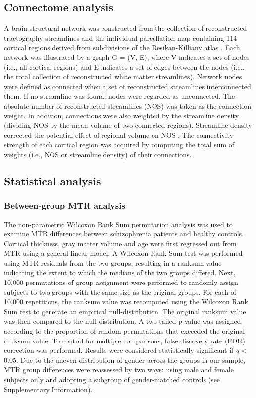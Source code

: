 \begin{refsection}
\subsection*{Connectome analysis}
A brain structural network was constructed from the collection of reconstructed tractography streamlines and the individual parcellation map containing 114 cortical regions derived from subdivisions of the Desikan-Killiany atlas \citep{CAMMOUN2012386,DESIKAN2006968,Fischl2004parcellation}. Each network was illustrated by a graph G = (V, E), where V indicates a set of nodes (i.e., all cortical regions) and E indicates a set of edges between the nodes (i.e., the total collection of reconstructed white matter streamlines). Network nodes were defined as connected when a set of reconstructed streamlines interconnected them. If no streamline was found, nodes were regarded as unconnected. The absolute number of reconstructed streamlines (NOS) was taken as the connection weight. In addition, connections were also weighted by the streamline density (dividing NOS by the mean volume of two connected regions). Streamline density corrected the potential effect of regional volume on NOS \citep{Hagmann2008MappingTS,vanDenHeuvel2011RichclubOO}. The connectivity strength of each cortical region was acquired by computing the total sum of weights (i.e., NOS or streamline density) of their connections.

\subsection*{Statistical analysis}
\subsubsection*{Between-group MTR analysis}
The non-parametric Wilcoxon Rank Sum permutation analysis was used to examine MTR differences between schizophrenia patients and healthy controls. Cortical thickness, gray matter volume and age were first regressed out from MTR using a general linear model. A Wilcoxon Rank Sum test was performed using MTR residuals from the two groups, resulting in a ranksum value indicating the extent to which the medians of the two groups differed. Next, 10,000 permutations of group assignment were performed to randomly assign subjects to two groups with the same size as the original groups. For each of 10,000 repetitions, the ranksum value was recomputed using the Wilcoxon Rank Sum test to generate an empirical null-distribution. The original ranksum value was then compared to the null-distribution.  A two-tailed p-value was assigned according to the proportion of random permutations that exceeded the original ranksum value. To control for multiple comparisons, false discovery rate (FDR) correction was performed. Results were considered statistically significant if \textit{q} < 0.05. Due to the uneven distribution of gender across the groups in our sample, MTR group differences were reassessed by two ways: using male and female subjects only and adopting a subgroup of gender-matched controls (see Supplementary Information).


\end{refsection}
